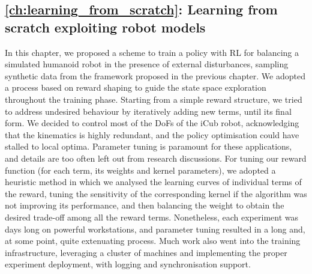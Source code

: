 \subsection*{\autoref{ch:learning_from_scratch}: Learning from scratch exploiting robot models}

In this chapter, we proposed a scheme to train a policy with \ac{RL} for balancing a simulated humanoid robot in the presence of external disturbances, sampling synthetic data from the framework proposed in the previous chapter.
We adopted a process based on reward shaping to guide the state space exploration throughout the training phase.
Starting from a simple reward structure, we tried to address undesired behaviour by iteratively adding new terms, until its final form.
We decided to control most of the \acp{DoF} of the iCub robot, acknowledging that the kinematics is highly redundant, and the policy optimisation could have stalled to local optima.
Parameter tuning is paramount for these applications, and details are too often left out from research discussions.
For tuning our reward function (for each term, its weights and kernel parameters), we adopted a heuristic method in which we analysed the learning curves of individual terms of the reward, tuning the sensitivity of the corresponding kernel if the algorithm was not improving its performance, and then balancing the weight to obtain the desired trade-off among all the reward terms.
Nonetheless, each experiment was days long on powerful workstations, and parameter tuning resulted in a long and, at some point, quite extenuating process.
Much work also went into the training infrastructure, leveraging a cluster of machines and implementing the proper experiment deployment, with logging and synchronisation support.


